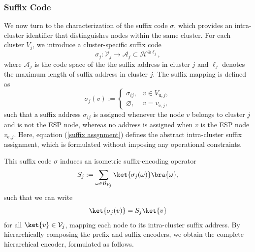 \documentclass[conference]{IEEEtran}
\begin{document}
\subsubsection{Suffix Code}
We now turn to the characterization of the suffix code $\sigma$, which provides an intra-cluster identifier that distinguishes nodes within the same cluster.  
For each cluster $V_j$, we introduce a cluster-specific suffix code
\begin{equation}
    \sigma_j : \mathcal{V}_j \longrightarrow \mathcal{A}_j \subset \mathcal{H}^{\oplus \ell_{j}},
\end{equation}
where $\mathcal{A}_j$ is the code space of the the suffix address in cluster $j$ and $\ell_{j}$ denotes the maximum length of suffix address in cluster $j$. The suffix mapping is defined as
\begin{equation}
\sigma_j(v) :=
\begin{cases}
\sigma_{ij}, & v \in V_{\mathrm{u},j},\\
\varnothing, & v = v_{\mathrm{e},j},
\end{cases} \label{suffix assgnment}
\end{equation}
such that a suffix address $\sigma_{ij}$ is assigned whenever the node $v$ belongs to cluster $j$ and is not the ESP node, whereas no address is assigned when $v$ is the ESP node $v_{\mathrm{e},j}$. Here, equation (\ref{suffix assgnment}) defines the abstract intra-cluster suffix assignment, which is formulated without imposing any operational constraints.

This suffix code $\sigma$ induces an isometric suffix-encoding operator
\begin{equation}
    {S_j}
    := \sum_{\omega \in \mathcal{B}_{V_j}} \ket{\sigma_j(\omega)}\bra{\omega}, \label{Suffix_Encoder_Operator}
\end{equation}
such that we can write
\begin{equation}
    \ket{\sigma_j(v)}={S_j}\ket{v}
\end{equation}
for all $\ket{v} \in \mathcal{V}_j$, mapping each node to its intra-cluster suffix address.
By hierarchically composing the prefix and suffix encoders, we obtain the complete hierarchical encoder, formulated as follows.
\end{document}
